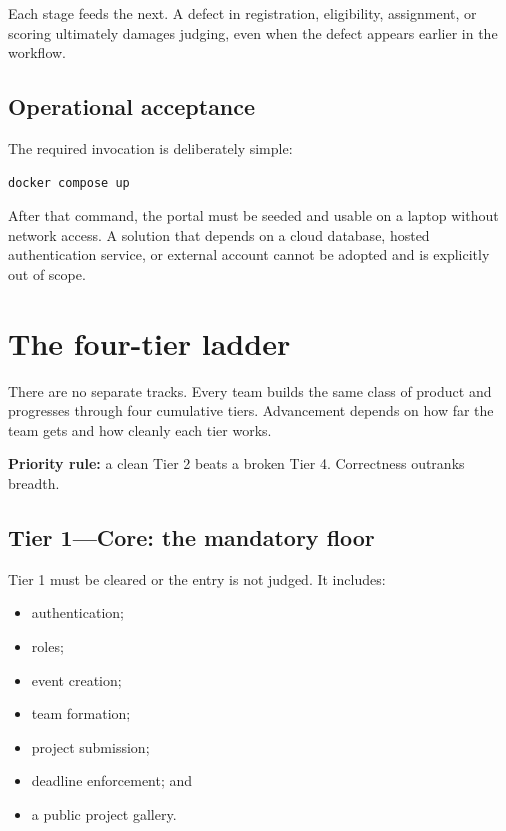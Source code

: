 \documentclass[11pt]{article}
\begin{document}
Each stage feeds the next. A defect in registration, eligibility, assignment, or scoring ultimately damages judging, even when the defect appears earlier in the workflow.

\subsection{Operational acceptance}

The required invocation is deliberately simple:

\begin{lstlisting}[style=dogfood]
docker compose up
\end{lstlisting}

After that command, the portal must be seeded and usable on a laptop without network access. A solution that depends on a cloud database, hosted authentication service, or external account cannot be adopted and is explicitly out of scope.

\section{The four-tier ladder}

There are no separate tracks. Every team builds the same class of product and progresses through four cumulative tiers. Advancement depends on how far the team gets and how cleanly each tier works.

\begin{keybox}
\textbf{Priority rule:} a clean Tier 2 beats a broken Tier 4. Correctness outranks breadth.
\end{keybox}

\subsection{Tier 1---Core: the mandatory floor}

Tier 1 must be cleared or the entry is not judged. It includes:

\begin{itemize}
  \item authentication;
  \item roles;
  \item event creation;
  \item team formation;
  \item project submission;
  \item deadline enforcement; and
  \item a public project gallery.
\end{itemize}
\end{document}
